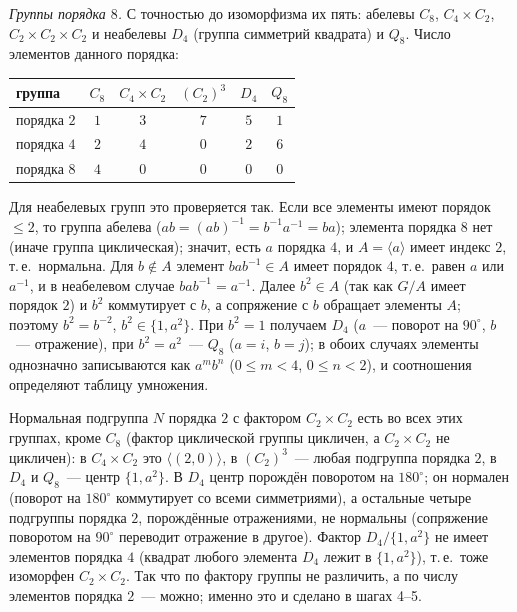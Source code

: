 \begin{aside}
\emph{Группы порядка $8$.} С точностью до изоморфизма их пять: абелевы $C_8$, $C_4\times C_2$, $C_2\times C_2\times C_2$ и
неабелевы $D_4$ (группа симметрий квадрата) и $Q_8$. Число элементов данного порядка:
\begin{center}
\begin{tabular}{lccccc}
группа & $C_8$ & $C_4\times C_2$ & $(C_2)^3$ & $D_4$ & $Q_8$\\\hline
порядка $2$ & $1$ & $3$ & $7$ & $5$ & $1$\\
порядка $4$ & $2$ & $4$ & $0$ & $2$ & $6$\\
порядка $8$ & $4$ & $0$ & $0$ & $0$ & $0$
\end{tabular}
\end{center}
Для неабелевых групп это проверяется так. Если все элементы имеют порядок $\le2$, то группа абелева ($ab=(ab)^{-1}=b^{-1}a^{-1}=ba$);
элемента порядка $8$ нет (иначе группа циклическая); значит, есть $a$ порядка $4$, и $A=\langle a\rangle$ имеет индекс $2$, т.\,е.\
нормальна. Для $b\notin A$ элемент $bab^{-1}\in A$ имеет порядок $4$, т.\,е.\ равен $a$ или $a^{-1}$, и в неабелевом случае
$bab^{-1}=a^{-1}$. Далее $b^2\in A$ (так как $G/A$ имеет порядок $2$) и $b^2$ коммутирует с $b$, а сопряжение с $b$ обращает
элементы $A$; поэтому $b^2=b^{-2}$, $b^2\in\{1,a^2\}$. При $b^2=1$ получаем $D_4$ ($a$~--- поворот на $90^\circ$, $b$~---
отражение), при $b^2=a^2$~--- $Q_8$ ($a=i$, $b=j$); в обоих случаях элементы однозначно записываются как $a^mb^n$
($0\le m<4$, $0\le n<2$), и соотношения определяют таблицу умножения.

Нормальная подгруппа $N$ порядка $2$ с фактором $C_2\times C_2$ есть во всех этих группах, кроме $C_8$ (фактор циклической группы цикличен, а $C_2\times C_2$ не
цикличен): в $C_4\times C_2$
это $\langle(2,0)\rangle$, в $(C_2)^3$~--- любая подгруппа порядка $2$, в $D_4$ и $Q_8$~--- центр $\{1,a^2\}$. В $D_4$ центр
порождён поворотом на $180^\circ$; он нормален (поворот на $180^\circ$ коммутирует со всеми симметриями), а остальные
четыре подгруппы порядка $2$, порождённые отражениями, не нормальны (сопряжение поворотом на $90^\circ$ переводит
отражение в другое). Фактор $D_4/\{1,a^2\}$ не имеет элементов порядка $4$ (квадрат любого элемента $D_4$ лежит в
$\{1,a^2\}$), т.\,е.\ тоже изоморфен $C_2\times C_2$. Так что по фактору группы не различить, а по числу элементов порядка
$2$~--- можно; именно это и сделано в шагах 4--5.
\end{aside}

